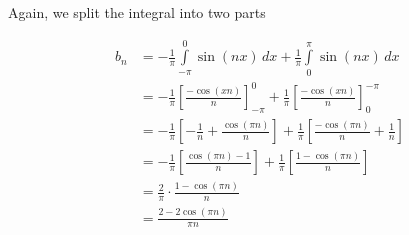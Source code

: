 \documentclass{article}
\newcommand{\integral}[4]{\int\limits_{#1}^{#2} #3\,d#4}
\begin{document}
\begin{preview}
Again, we split the integral into two parts

\begin{align*}
    b_n &=
    -\frac{1}{\pi} \integral{-\pi}{0}{\sin(nx)}{x} +
    \frac{1}{\pi} \integral{0}{\pi}{\sin(nx)}{x} \\
    &= -\frac{1}{\pi} {\left[\frac{-\cos(xn)}{n}\right]}_{-\pi}^{0} +
    \frac{1}{\pi} {\left[\frac{-\cos(xn)}{n}\right]}_{0}^{-\pi} \\
    &= -\frac{1}{\pi} \left[-\frac{1}{n}+\frac{\cos(\pi n)}{n}\right] +
    \frac{1}{\pi} \left[\frac{-\cos(\pi n)}{n}+\frac{1}{n}\right] \\
    &= -\frac{1}{\pi} \left[\frac{\cos(\pi n)-1}{n}\right] +
    \frac{1}{\pi} \left[\frac{1-\cos(\pi n)}{n}\right] \\
    &= \frac{2}{\pi} \cdot \frac{1-\cos(\pi n)}{n} \\
    &= \frac{2-2\cos(\pi n)}{\pi n}
\end{align*}

\end{preview}
\end{document}
